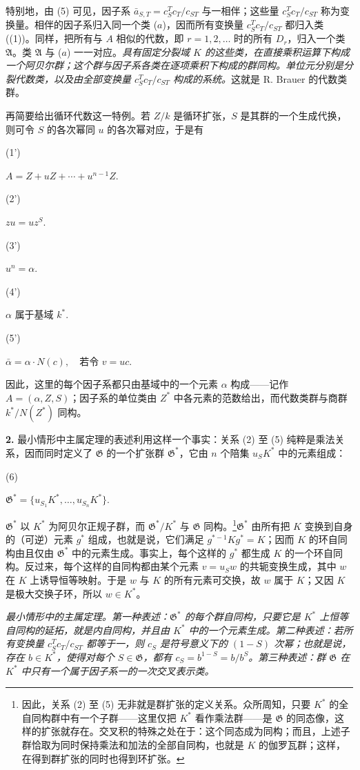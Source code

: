 \documentclass[11pt]{article}
\providecommand{\srcnumdisplay}[3][3.4em]{%
  \par\smallskip\noindent
  \begin{minipage}[t]{#1}\vspace*{0pt}#2\end{minipage}%
  \begin{minipage}[t]{\dimexpr\linewidth-#1\relax}\vspace*{0pt}\centering
  \(\displaystyle #3\)
  \end{minipage}\par\smallskip}
\begin{document}
特别地，由 (5) 可见，因子系 \(\bar a_{S,T}=c_S^Tc_T/c_{ST}\) 与一相伴；这些量 \(c_S^Tc_T/c_{ST}\) 称为变换量。相伴的因子系归入同一个类 (\(a\))，因而所有变换量 \(c_S^Tc_T/c_{ST}\) 都归入类 ((1))。同样，把所有与 \(A\) 相似的代数，即 \(r=1,2,\ldots\) 时的所有 \(D_r\)，归入一个类 \(\mathfrak A\)。类 \(\mathfrak A\) 与 (\(a\)) 一一对应。\emph{具有固定分裂域 \(K\) 的这些类，在直接乘积运算下构成一个阿贝尔群；这个群与因子系各类在逐项乘积下构成的群同构。单位元分别是分裂代数类，以及由全部变换量 \(c_S^Tc_T/c_{ST}\) 构成的系统。}这就是 R. Brauer 的代数类群。

再简要给出循环代数这一特例。若 \(Z/k\) 是循环扩张，\(S\) 是其群的一个生成代换，则可令 \(S\) 的各次幂同 \(u\) 的各次幂对应，于是有

\srcnumdisplay{(1')}{A=Z+uZ+\cdots+u^{n-1}Z.}
\srcnumdisplay{(2')}{zu=uz^S.}
\srcnumdisplay{(3')}{u^n=\alpha.}
\srcnumdisplay{(4')}{\alpha\text{ 属于基域 }k^*.}
\srcnumdisplay{(5')}{\bar\alpha=\alpha\cdot N(c),\quad\text{若令 }v=uc.}

因此，这里的每个因子系都只由基域中的一个元素 \(\alpha\) 构成——记作 \(A=(\alpha,Z,S)\)；因子系的单位类由 \(Z^*\) 中各元素的范数给出，而代数类群与商群 \(k^*/N(Z^*)\) 同构。

\noindent\textbf{2.} 最小情形中主属定理的表述利用这样一个事实：关系 (2) 至 (5) 纯粹是乘法关系，因而同时定义了 \(\mathfrak G\) 的一个扩张群 \(\mathfrak G^*\)，它由 \(n\) 个陪集 \(u_SK^*\) 中的元素组成：

\srcnumdisplay{(6)}{\mathfrak G^*=\{u_{S_1}K^*,\ldots,u_{S_n}K^*\}.}

\(\mathfrak G^*\) 以 \(K^*\) 为阿贝尔正规子群，而 \(\mathfrak G^*/K^*\) 与 \(\mathfrak G\) 同构。\footnote{因此，关系 (2) 至 (5) 无非就是群扩张的定义关系。众所周知，只要 \(K^*\) 的全自同构群中有一个子群——这里仅把 \(K^*\) 看作乘法群——是 \(\mathfrak G\) 的同态像，这样的扩张就存在。交叉积的特殊之处在于：这个同态成为同构；而且，上述子群恰取为同时保持乘法和加法的全部自同构，也就是 \(K\) 的伽罗瓦群；这样，在得到群扩张的同时也得到环扩张。}\(\mathfrak G^*\) 由所有把 \(K\) 变换到自身的（可逆）元素 \(g^*\) 组成，也就是说，它们满足 \(g^{*-1}Kg^*=K\)；因而 \(K\) 的环自同构由且仅由 \(\mathfrak G^*\) 中的元素生成。事实上，每个这样的 \(g^*\) 都生成 \(K\) 的一个环自同构。反过来，每个这样的自同构都由某个元素 \(v=u_Sw\) 的共轭变换生成，其中 \(w\) 在 \(K\) 上诱导恒等映射。于是 \(w\) 与 \(K\) 的所有元素可交换，故 \(w\) 属于 \(K\)；又因 \(K\) 是极大交换子环，所以 \(w\in K^*\)。

\emph{最小情形中的主属定理。第一种表述：\(\mathfrak G^*\) 的每个群自同构，只要它是 \(K^*\) 上恒等自同构的延拓，就是内自同构，并且由 \(K^*\) 中的一个元素生成。第二种表述：若所有变换量 \(c_S^Tc_T/c_{ST}\) 都等于一，则 \(c_S\) 是符号意义下的 \((1-S)\) 次幂；也就是说，存在 \(b\in K^*\)，使得对每个 \(S\in\mathfrak G\)，都有 \(c_S=b^{1-S}=b/b^S\)。第三种表述：群 \(\mathfrak G\) 在 \(K^*\) 中只有一个属于因子系一的一次交叉表示类。}
\end{document}
